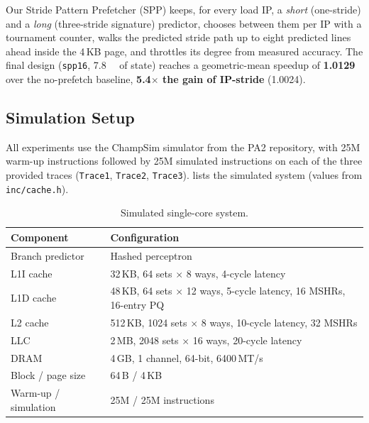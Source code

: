 \documentclass[12pt, a4paper]{article}
\newcommand{\tablesetup}{\small\renewcommand{\arraystretch}{1.15}\setlength{\tabcolsep}{4pt}}
\newcommand{\colhead}[1]{\textbf{#1}}
\begin{document}
Our Stride Pattern
Prefetcher (SPP) keeps, for every load IP, a \emph{short} (one-stride)
and a \emph{long} (three-stride signature) predictor, chooses between them per
IP with a tournament counter, walks the predicted stride path up to eight
predicted lines ahead inside the 4\,KB page, and throttles its degree from measured accuracy.
The final design (\texttt{spp16}, \SI{7.8}{\kilo\byte} of state) reaches a
geometric-mean speedup of \textbf{1.0129} over the no-prefetch baseline,
\textbf{5.4$\times$ the gain of IP-stride} (1.0024).

\subsection{Simulation Setup}\label{sec:setup}
All experiments use the ChampSim simulator from the PA2 repository, with
\num{25}M warm-up instructions followed by \num{25}M simulated instructions
on each of the three provided traces (\texttt{Trace1}, \texttt{Trace2},
\texttt{Trace3}).  lists the simulated system
(values from \texttt{inc/cache.h}).

\begin{table}[htbp]
\centering
\caption{Simulated single-core system.}\label{tab:config}
\tablesetup
\begin{tabular}{ll}
\toprule
\rowcolor{tablehead}\colhead{Component} & \colhead{Configuration} \\
\midrule
Branch predictor & Hashed perceptron \\
L1I cache & 32\,KB, 64 sets $\times$ 8 ways, 4-cycle latency \\
L1D cache & 48\,KB, 64 sets $\times$ 12 ways, 5-cycle latency, 16 MSHRs, 16-entry PQ \\
L2 cache  & 512\,KB, 1024 sets $\times$ 8 ways, 10-cycle latency, 32 MSHRs \\
LLC       & 2\,MB, 2048 sets $\times$ 16 ways, 20-cycle latency \\
DRAM      & 4\,GB, 1 channel, 64-bit, 6400\,MT/s \\
Block / page size & 64\,B / 4\,KB \\
Warm-up / simulation & 25M / 25M instructions \\
\bottomrule
\end{tabular}
\end{table}
\end{document}
